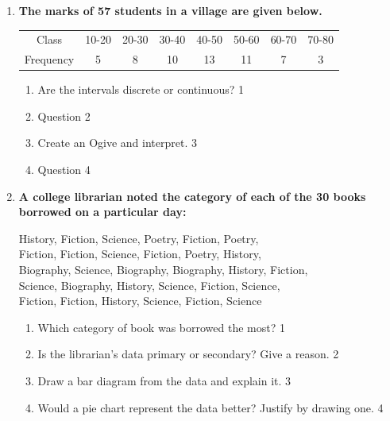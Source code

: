 \documentclass[a4paper,oneside]{book}
\begin{document}
\begin{enumerate}
  
  \begin{enumerate}
    \item  
	 Create a frequency distribution and interpret. \hfill 3
    \item
	Create a Histogram from the data and explain. If the no. of 
	classes were fewer, how would the \\ pattern of the distribution shift? \hfill 4
  \end{enumerate}
  
   \item
	  \textbf{The marks of 57 students in a village are given below.}
	  
	  \begin{table}[h]
	  \centering
\begin{tabular}{c|c|c|c|c|c|c|c}
Class     & 10-20 & 20-30 & 30-40 & 40-50 & 50-60 & 60-70 & 70-80 \\
Frequency & 5     & 8     & 10    & 13    & 11    & 7     & 3    
\end{tabular}
\end{table}
  
  \begin{enumerate}
    \item
	Are the intervals discrete or continuous? \hfill 1
    \item
	Question \hfill 2
    \item  
	Create an Ogive and interpret. \hfill 3
    \item
	Question \hfill 4
  \end{enumerate}
  

\item
\textbf{A college librarian noted the category of each of the 30 books borrowed on a particular day:}
\begin{center}
History, Fiction, Science, Poetry, Fiction, Poetry,\\
Fiction, Fiction, Science, Fiction, Poetry, History,\\
Biography, Science, Biography, Biography, History, Fiction,\\
Science, Biography, History, Science, Fiction, Science,\\
Fiction, Fiction, History, Science, Fiction, Science
\end{center}
\begin{enumerate}
  \item Which category of book was borrowed the most? \hfill 1
  \item Is the librarian's data primary or secondary? Give a reason. \hfill 2
  \item Draw a bar diagram from the data and explain it. \hfill 3
  \item Would a pie chart represent the data better? Justify by drawing one. \hfill 4
\end{enumerate}


\end{enumerate}
\end{document}
